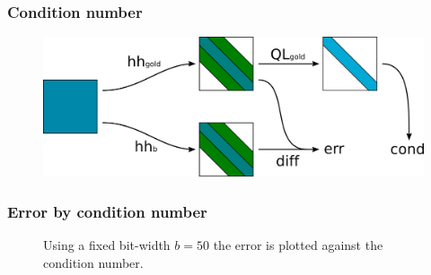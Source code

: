 \documentclass[serif, 12pt]{beamer}
\begin{document}

\begin{frame}

\frametitle{Condition number}

\begin{figure}[h]
	\includegraphics[width=\linewidth]{img/exp4}
\end{figure}


\end{frame}


\begin{frame}

\frametitle{Error by condition number}

\begin{figure}[h]
	\caption{Using a fixed bit-width $b=50$ the error is plotted against the 
condition number.}
	\label{fig:errhh}
\end{figure}


\end{frame}

\end{document}
